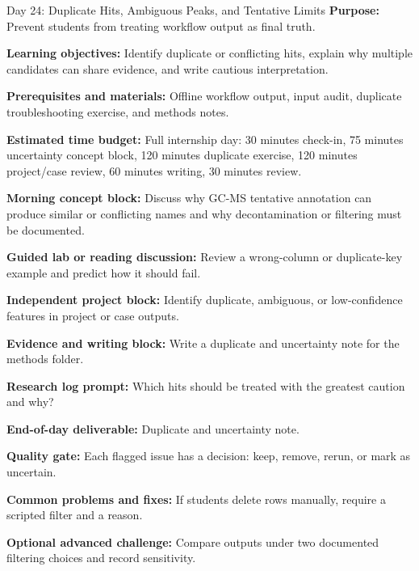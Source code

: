 \begin{dailybox}{Day 24: Duplicate Hits, Ambiguous Peaks, and Tentative Limits}
\textbf{Purpose:} Prevent students from treating workflow output as final truth.

\textbf{Learning objectives:} Identify duplicate or conflicting hits, explain why multiple candidates can share evidence, and write cautious interpretation.

\textbf{Prerequisites and materials:} Offline workflow output, input audit, duplicate troubleshooting exercise, and methods notes.

\textbf{Estimated time budget:} Full internship day: 30 minutes check-in, 75 minutes uncertainty concept block, 120 minutes duplicate exercise, 120 minutes project/case review, 60 minutes writing, 30 minutes review.

\textbf{Morning concept block:} Discuss why GC-MS tentative annotation can produce similar or conflicting names and why decontamination or filtering must be documented.

\textbf{Guided lab or reading discussion:} Review a wrong-column or duplicate-key example and predict how it should fail.

\textbf{Independent project block:} Identify duplicate, ambiguous, or low-confidence features in project or case outputs.

\textbf{Evidence and writing block:} Write a duplicate and uncertainty note for the methods folder.

\textbf{Research log prompt:} Which hits should be treated with the greatest caution and why?

\textbf{End-of-day deliverable:} Duplicate and uncertainty note.

\textbf{Quality gate:} Each flagged issue has a decision: keep, remove, rerun, or mark as uncertain.

\textbf{Common problems and fixes:} If students delete rows manually, require a scripted filter and a reason.

\textbf{Optional advanced challenge:} Compare outputs under two documented filtering choices and record sensitivity.
\end{dailybox}

